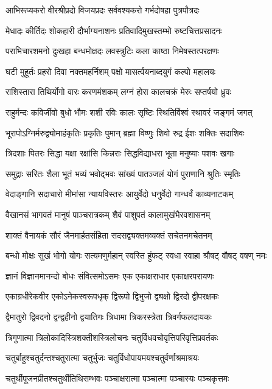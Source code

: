 \twolineshloka
{आभिरूप्यकरो वीरश्रीप्रदो विजयप्रदः}
{सर्ववश्यकरो गर्भदोषहा पुत्रपौत्रदः}

\twolineshloka
{मेधादः कीर्तिदः शोकहारी दौर्भाग्यनाशनः}
{प्रतिवादिमुखस्तम्भो रुष्टचित्तप्रसादनः}

\twolineshloka
{पराभिचारशमनो दुःखहा बन्धमोक्षदः}
{लवस्त्रुटिः कला काष्ठा निमेषस्तत्परक्षणः}

\twolineshloka
{घटी मुहूर्तः प्रहरो दिवा नक्तमहर्निशम्}
{पक्षो मासर्त्वयनाब्दयुगं कल्पो महालयः}

\twolineshloka
{राशिस्तारा तिथिर्योगो वारः करणमंशकम्}
{लग्नं होरा कालचक्रं मेरुः सप्तर्षयो ध्रुवः}

\twolineshloka
{राहुर्मन्दः कविर्जीवो बुधो भौमः शशी रविः}
{कालः सृष्टिः स्थितिर्विश्वं स्थावरं जङ्गमं जगत्}

\twolineshloka
{भूरापोऽग्निर्मरुद्व्योमाहंकृतिः प्रकृतिः पुमान्}
{ब्रह्मा विष्णुः शिवो रुद्र ईशः शक्तिः सदाशिवः}

\twolineshloka
{त्रिदशाः पितरः सिद्धा यक्षा रक्षांसि किन्नराः}
{सिद्धविद्याधरा भूता मनुष्याः पशवः खगाः}

\twolineshloka
{समुद्राः सरितः शैला भूतं भव्यं भवोद्भवः}
{सांख्यं पातञ्जलं योगं पुराणानि श्रुतिः स्मृतिः}

\twolineshloka
{वेदाङ्गानि सदाचारो मीमांसा न्यायविस्तरः}
{आयुर्वेदो धनुर्वेदो गान्धर्वं काव्यनाटकम्}

\twolineshloka
{वैखानसं भागवतं मानुषं पाञ्चरात्रकम्}
{शैवं पाशुपतं कालामुखंभैरवशासनम्}

\twolineshloka
{शाक्तं वैनायकं सौरं जैनमार्हतसंहिता}
{सदसद्व्यक्तमव्यक्तं सचेतनमचेतनम्}

\twolineshloka
{बन्धो मोक्षः सुखं भोगो योगः सत्यमणुर्महान्}
{स्वस्ति हुंफट् स्वधा स्वाहा श्रौषट् वौषट् वषण् नमः}

\twolineshloka
{ज्ञानं विज्ञानमानन्दो बोधः संवित्समोऽसमः}
{एक एकाक्षराधार एकाक्षरपरायणः}

\twolineshloka
{एकाग्रधीरेकवीर एकोऽनेकस्वरूपधृक्}
{द्विरूपो द्विभुजो द्व्यक्षो द्विरदो द्वीपरक्षकः}

\twolineshloka
{द्वैमातुरो द्विवदनो द्वन्द्वहीनो द्वयातिगः}
{त्रिधामा त्रिकरस्त्रेता त्रिवर्गफलदायकः}

\twolineshloka
{त्रिगुणात्मा त्रिलोकादिस्त्रिशक्तीशस्त्रिलोचनः}
{चतुर्विधवचोवृत्तिपरिवृत्तिप्रवर्तकः}

\twolineshloka
{चतुर्बाहुश्चतुर्दन्तश्चतुरात्मा चतुर्भुजः}
{चतुर्विधोपायमयश्चतुर्वर्णाश्रमाश्रयः}

\twolineshloka
{चतुर्थीपूजनप्रीतश्चतुर्थीतिथिसम्भवः}
{पञ्चाक्षरात्मा पञ्चात्मा पञ्चास्यः पञ्चकृत्तमः}

